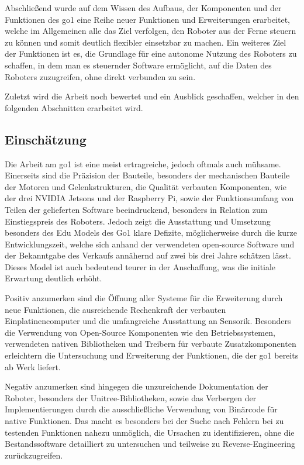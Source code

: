 Abschließend wurde auf dem Wissen des Aufbaus, der Komponenten und der Funktionen des \gls{go1} eine Reihe neuer Funktionen
und Erweiterungen erarbeitet, welche im Allgemeinen alle das Ziel verfolgen, den Roboter aus der Ferne steuern zu können
und somit deutlich flexibler einsetzbar zu machen.
Ein weiteres Ziel der Funktionen ist es, die Grundlage für eine autonome Nutzung des Roboters zu schaffen, in dem man es
steuernder Software ermöglicht, auf die Daten des Roboters zuzugreifen, ohne direkt verbunden zu sein.

Zuletzt wird die Arbeit noch bewertet und ein Ausblick geschaffen, welcher in den folgenden Abschnitten erarbeitet wird.

\subsection{Einschätzung}
\label{subsec:einschatzung}

Die Arbeit am \gls{go1} ist eine meist ertragreiche, jedoch oftmals auch mühsame.
Einerseits sind die Präzision der Bauteile, besonders der mechanischen Bauteile der Motoren und Gelenkstrukturen, die Qualität
verbauten Komponenten, wie der drei NVIDIA Jetsons und der Raspberry Pi, sowie der Funktionsumfang von Teilen der
gelieferten Software beeindruckend, besonders in Relation zum Einstiegspreis des Roboters.
Jedoch zeigt die Ausstattung und Umsetzung besonders des Edu Models des Go1 klare Defizite, möglicherweise durch die kurze
Entwicklungszeit, welche sich anhand der verwendeten open-source Software und der Bekanntgabe des Verkaufs annähernd auf
zwei bis drei Jahre schätzen lässt.
Dieses Model ist auch bedeutend teurer in der Anschaffung, was die initiale Erwartung deutlich erhöht.

Positiv anzumerken sind die Öffnung aller Systeme für die Erweiterung durch neue Funktionen, die ausreichende Rechenkraft
der verbauten Einplatinencomputer und die umfangreiche Ausstattung an Sensorik.
Besonders die Verwendung von Open-Source Komponenten wie den Betriebssystemen, verwendeten nativen Bibliotheken und
Treibern für verbaute Zusatzkomponenten erleichtern die Untersuchung und Erweiterung der Funktionen, die der \gls{go1}
bereits ab Werk liefert.

Negativ anzumerken sind hingegen die unzureichende Dokumentation der Roboter, besonders der Unitree-Bibliotheken, sowie
das Verbergen der Implementierungen durch die ausschließliche Verwendung von Binärcode für native Funktionen.
Das macht es besonders bei der Suche nach Fehlern bei zu testenden Funktionen nahezu unmöglich, die Ursachen zu identifizieren,
ohne die Bestandssoftware detailliert zu untersuchen und teilweise zu Reverse-Engineering zurückzugreifen.

